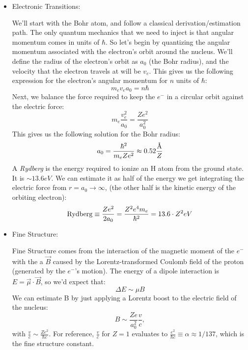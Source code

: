 \documentclass{article}
\newcommand{\angstrom}{\mbox{\normalfont\AA}}
\begin{document}
\begin{itemize}
\item Electronic Transitions:\par

We'll start with the Bohr atom, and follow a classical derivation/estimation path.  The only quantum mechanics that we need to 
inject is that angular momentum comes in units of $\hbar$.  So let's begin by quantizing the angular momentum associated with the electron's orbit around the nucleus.  We'll define the radius of the electron's orbit as $a_0$ (the Bohr radius), and the velocity that the electron travels at will be $v_e$.  This gives us the following expression for the electron's angular momentum for $n$ units of $\hbar$:
\begin{equation}
m_ev_ea_0=n\hbar
\end{equation}
Next, we balance the force required to keep the $e^-$ in a circular orbit
against the electric force:
\begin{equation}
m_e\frac{v_e^2}{a_0}=\frac{Ze^2}{a_0^2}
\end{equation}
This gives us the following solution for the Bohr radius:
\begin{equation}
a_0=\frac{\hbar^2}{m_eZe^2}\approx0.52\frac{\angstrom}{Z}
\end{equation}
A {\it Rydberg} is the energy required to ionize an H atom from the ground
state.  It is $\sim13.6eV$.  We can estimate it as half of the energy we get integrating the electric
force from $r=a_0\rightarrow\infty$, (the other half is the kinetic energy of the orbiting electron):
\begin{equation}
{\rm Rydberg}\equiv\frac{Ze^2}{2a_0}=\frac{Z^2e^4m_e}{\hbar^2}=13.6\cdot Z^2eV
\end{equation}

\item Fine Structure:\par
Fine Structure comes from the interaction of the magnetic moment of the $e^-$
with the a $\vec{B}$ caused by the
Lorentz-transformed Coulomb field of the proton (generated by the $e^-$'s 
motion).  The 
energy of a dipole interaction is $E=\vec\mu\cdot\vec{B}$, so we'd expect
that:
\begin{equation}
\Delta E\sim\mu B
\end{equation}
We can estimate B by just applying a Lorentz boost to the electric field of the nucleus:
\begin{equation}
B\sim\frac{Ze}{a_0^2}\frac{v}{c},
\end{equation}
with $\frac{v}{c}\sim\frac{Ze^2}{\hbar c}$.  For reference, $\frac{v}{c}$ for $Z=1$ evaluates to $\frac{e^2}{\hbar c}\equiv\alpha\approx 1/137$, which is the fine structure constant.  


\end{itemize}
\end{document}
